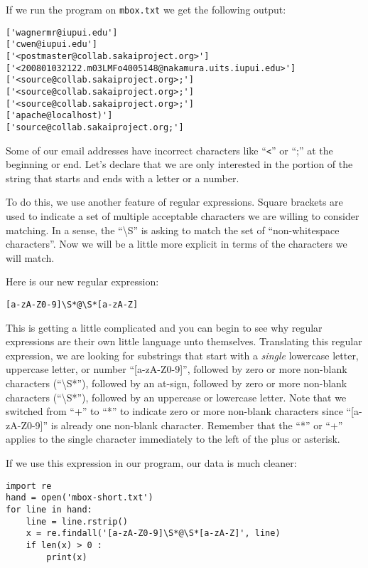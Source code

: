 If we run the program on {\tt mbox.txt} we get the following output:

\beforeverb
\begin{verbatim}
['wagnermr@iupui.edu']
['cwen@iupui.edu']
['<postmaster@collab.sakaiproject.org>']
['<200801032122.m03LMFo4005148@nakamura.uits.iupui.edu>']
['<source@collab.sakaiproject.org>;']
['<source@collab.sakaiproject.org>;']
['<source@collab.sakaiproject.org>;']
['apache@localhost)']
['source@collab.sakaiproject.org;']
\end{verbatim}
\afterverb
%
Some of our email addresses have incorrect characters like ``\verb"<"'' or ``;'' at the beginning
or end.   Let's declare that we are only interested in the portion of the string that starts and
ends with a letter or a number.

To do this, we use another feature of regular expressions.  Square brackets are used to indicate a
set of multiple acceptable characters we are willing to consider matching.  In a sense, the
``{\textbackslash}S'' is asking to match the set of ``non-whitespace characters''.  Now we will be
a little more explicit in terms of the characters we will match.

Here is our new regular expression:

\beforeverb
\begin{verbatim}
[a-zA-Z0-9]\S*@\S*[a-zA-Z]
\end{verbatim}
\afterverb
%
This is getting a little complicated and you can begin to see why regular expressions are their own
little language unto themselves.  Translating this regular expression, we are looking for substrings
that start with a {\em single} lowercase letter, uppercase letter, or number ``[a-zA-Z0-9]'', followed
by zero or more non-blank characters (``{\textbackslash}S*''), followed by an at-sign, followed by zero
or more non-blank characters (``{\textbackslash}S*''), followed by an uppercase or lowercase letter.
Note that we switched from ``+'' to ``*'' to indicate zero or more non-blank characters since ``[a-zA-Z0-9]''
is already one non-blank character.   Remember that the ``*'' or ``+'' applies to the single character
immediately to the left of the plus or asterisk.

If we use this expression in our program, our data is much cleaner:

\beforeverb
\begin{verbatim}
import re
hand = open('mbox-short.txt')
for line in hand:
    line = line.rstrip()
    x = re.findall('[a-zA-Z0-9]\S*@\S*[a-zA-Z]', line)
    if len(x) > 0 :
        print(x)
\end{verbatim}
\afterverb
%

